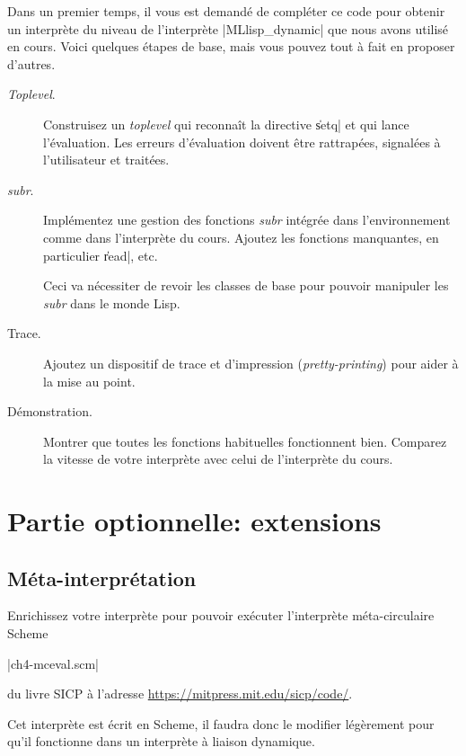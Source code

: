 \documentclass{../../../LaTeX/tdsimple}
\begin{document}
Dans un premier temps, il vous est demandé de compléter ce code pour
obtenir un interprète du niveau de l'interprète \file|MLlisp_dynamic|
que nous avons utilisé en cours. Voici quelques étapes de base, mais
vous pouvez tout à fait en proposer d'autres.
\begin{description}

\item[\emph{Toplevel}.]  Construisez un \emph{toplevel} qui reconnaît
  la directive \|setq| et qui lance l'évaluation. Les erreurs
  d'évaluation doivent être rattrapées, signalées à l'utilisateur et
  traitées.

\item[\emph{subr}.] Implémentez une gestion des fonctions \emph{subr}
  intégrée dans l'environnement comme dans l'interprète du
  cours. Ajoutez les fonctions manquantes, en particulier \|read|, etc.
  \begin{attention}
    Ceci va nécessiter de revoir les classes de base pour pouvoir
    manipuler les \emph{subr} dans le monde Lisp.
  \end{attention}

\item[Trace.] Ajoutez un dispositif de trace et d'impression
  (\emph{pretty-printing}) pour aider à la mise au point.

\item[Démonstration.] Montrer que toutes les fonctions habituelles
  fonctionnent bien. Comparez la vitesse de votre interprète avec
  celui de l'interprète du cours.

\end{description}

\section{Partie optionnelle: extensions}


\newcommand{\starlevel}[1]{%
\setcounter{starcounter}{0}%
\whiledo {\value{starcounter} < #1}{%
$\star$%
\stepcounter{starcounter}%
}%
}

\subsection{Méta-interprétation \protect\starlevel{1}}

Enrichissez votre interprète pour pouvoir exécuter l'interprète
méta-circulaire Scheme 
\begin{center}
  \file|ch4-mceval.scm|
\end{center}
du livre SICP à l'adresse
\url{https://mitpress.mit.edu/sicp/code/}. 
\begin{attention}
  Cet interprète est écrit en Scheme, il faudra donc le modifier
  légèrement pour qu'il fonctionne dans un interprète à liaison
  dynamique.
\end{attention}
\end{document}

